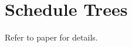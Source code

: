 \section{Schedule Trees}
Refer to paper \cite{grosser2014decoupled} \cite{verdoolaege2014schedule} for details.
